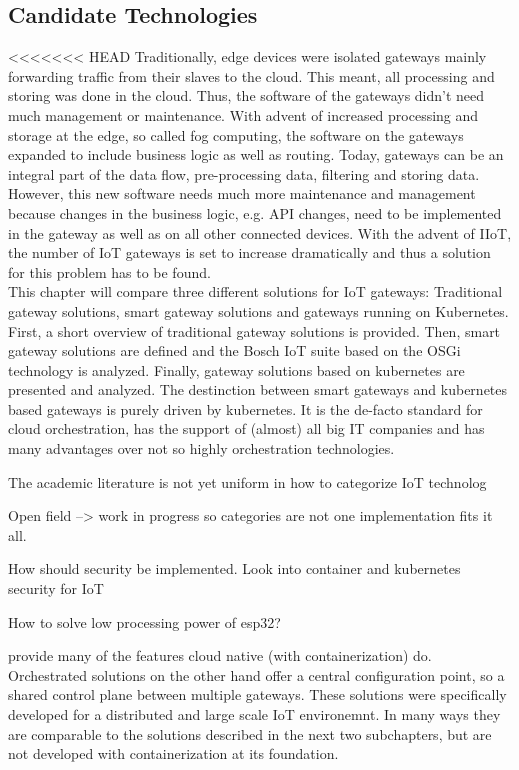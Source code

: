 \subsection{Candidate Technologies}
<<<<<<< HEAD
Traditionally, edge devices were isolated gateways mainly forwarding traffic from their slaves to the cloud. This meant, all processing and storing was done in the cloud. Thus, the software of the gateways didn't need much management or maintenance. With advent of increased processing and storage at the edge, so called fog computing, the software on the gateways expanded to include business logic as well as routing. Today, gateways can be an integral part of the data flow, pre-processing data, filtering and storing data. However, this new software needs much more maintenance and management because changes in the business logic, e.g. API changes, need to be implemented in the gateway as well as on all other connected devices. With the advent of IIoT, the number of IoT gateways is set to increase dramatically and thus a solution for this problem has to be found.\\ This chapter will compare three different solutions for IoT gateways: Traditional gateway solutions, smart gateway solutions and gateways running on Kubernetes. First, a short overview of traditional gateway solutions is provided. Then, smart gateway solutions are defined and the Bosch IoT suite based on the OSGi technology is analyzed. Finally, gateway solutions based on kubernetes are presented and analyzed. The destinction between smart gateways and kubernetes based gateways is purely driven by kubernetes. It is the de-facto standard for cloud orchestration, has the support of (almost) all big IT companies and has many advantages over not so highly orchestration technologies.



The academic literature is not yet uniform in how to categorize IoT technolog

Open field --> work in progress so categories are not one implementation fits it all.

How should security be implemented.
Look into container and kubernetes security for IoT

How to solve low processing power of esp32?


provide many of the features cloud native (with containerization) do. Orchestrated solutions on the other hand offer a central configuration point, so a shared control plane between multiple gateways. These solutions were specifically developed for a distributed and large scale IoT environemnt. In many ways they are comparable to the solutions described in the next two subchapters, but are not developed with containerization at its foundation.

